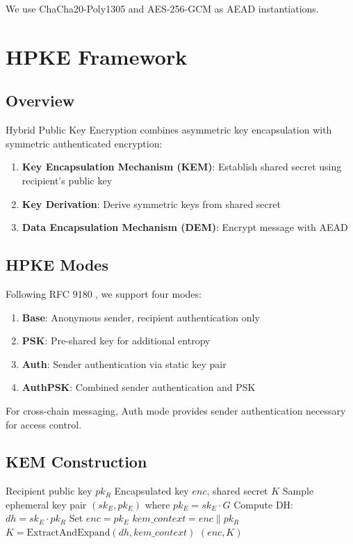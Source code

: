 \documentclass[11pt,a4paper]{article}
\begin{document}
We use ChaCha20-Poly1305 \cite{chacha} and AES-256-GCM as AEAD instantiations.

\section{HPKE Framework}

\subsection{Overview}

Hybrid Public Key Encryption combines asymmetric key encapsulation with symmetric authenticated encryption:

\begin{enumerate}
    \item \textbf{Key Encapsulation Mechanism (KEM)}: Establish shared secret using recipient's public key
    \item \textbf{Key Derivation}: Derive symmetric keys from shared secret
    \item \textbf{Data Encapsulation Mechanism (DEM)}: Encrypt message with AEAD
\end{enumerate}

\subsection{HPKE Modes}

Following RFC 9180 \cite{hpke}, we support four modes:

\begin{enumerate}
    \item \textbf{Base}: Anonymous sender, recipient authentication only
    \item \textbf{PSK}: Pre-shared key for additional entropy
    \item \textbf{Auth}: Sender authentication via static key pair
    \item \textbf{AuthPSK}: Combined sender authentication and PSK
\end{enumerate}

For cross-chain messaging, Auth mode provides sender authentication necessary for access control.

\subsection{KEM Construction}

\begin{algorithm}
\caption{DHKEM-Encap (Sender)}
\begin{algorithmic}[1]
\Require Recipient public key $pk_R$
\Ensure Encapsulated key $enc$, shared secret $K$
\State Sample ephemeral key pair $(sk_E, pk_E)$ where $pk_E = sk_E \cdot G$
\State Compute DH: $dh = sk_E \cdot pk_R$
\State Set $enc = pk_E$
\State $kem\_context = enc \| pk_R$
\State $K = \text{ExtractAndExpand}(dh, kem\_context)$
\State \Return $(enc, K)$
\end{algorithmic}
\end{algorithm}
\end{document}
